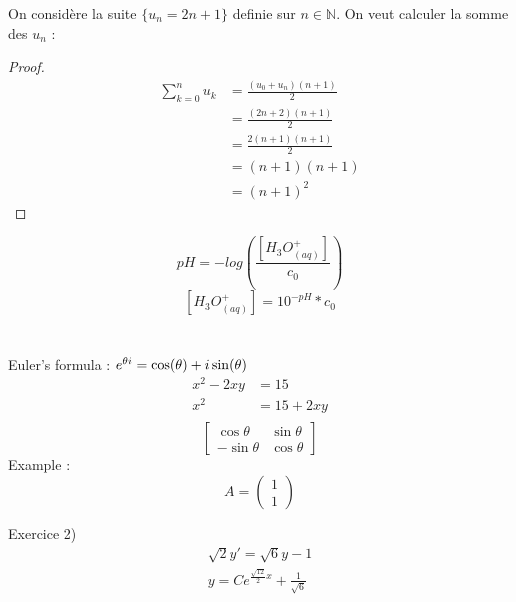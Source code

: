 \documentclass[french]{article}
\begin{document}
On considère la suite $\{u_n =2n+1\}$ definie sur $n\in\mathbb{N}$.
On veut calculer la somme des $u_n$ :
\begin{proof}
\begin{align*}
\sum_{k=0}^n u_k&=\frac{(u_0+u_n)(n+1)}{2}  \\
&=\frac{(2n+2)(n+1)}{2} \\
&=\frac{2(n+1)(n+1)}{2}  \\
&=(n+1)(n+1) \\
&=(n+1)^2
\end{align*}
\end{proof}
\[pH = -log\left(\frac{[H_3O^+_{(aq)}]}{c_0}\right)\]
\[[H_3O^+_{(aq)}]=10^{-pH}*c_0\]
\\
\\
Euler's formula : $e^{\theta\\i}=\cos(\theta)+i\sin(\theta)$ \\
\begin{align*}
x^2-2xy&=15 \\
x^2&=15+2xy \\
\end{align*}
\[\begin{bmatrix}
\cos\theta & \sin\theta \\
-\sin\theta & \cos\theta
\end{bmatrix}\]
Example :
\[
A=
\begin{pmatrix}
1 \\
1
\end{pmatrix}
\]




Exercice 2)
\begin{align*}
\sqrt{2}y'=\sqrt{6}y-1 \\
y=Ce^{\frac{\sqrt{12}}{2}x}+\frac{1}{\sqrt{6}}
\end{align*}
\end{document}
